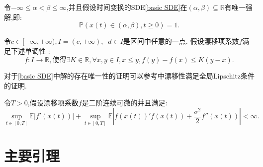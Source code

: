 \begin{assumption}\label{assum1}
	令$-\infty\leq\alpha<\beta\leq\infty$,并且假设时间变换的SDE\cref{basic SDE}在$(\alpha,\beta)\subseteq\mathbb{R}$有唯一强解,即:$$\mathbb{P}(x(t)\in(\alpha,\beta), t\geq0)=1.$$
\end{assumption}
\begin{assumption}\label{assum2}
	令$c\in[-\infty,+\infty),I=(c,+\infty),\operatorname{}d\in I$是区间中任意的一点. 假设漂移项系数$f$满足下述单调性 :
	\begin{equation}
		f:I\to\mathbb{R}  , 使得 \exists K \in\mathbb{R},\forall x,y\in I,x\leq y,f(y)-f(x)\leq K(y-x).
	\end{equation}
\end{assumption}
对于\cref{basic SDE}中解的存在唯一性的证明可以参考\cite{umarov2018beyond}中漂移性满足全局Lipschitz条件的证明.
\begin{assumption}\label{assum3}
	令$T>0$,假设漂移项系数$f$是二阶连续可微的并且满足:
	\begin{equation}
		\sup\limits_{t\in[0,T]}\mathbb{E}\left|f'(x(t))\right|+
		\sup\limits_{t\in[0,T]}\mathbb{E}\left|f(x(t))'f(x(t))+
		\frac{\sigma^2}2f''(x(t))\right|<\infty.
	\end{equation}
\end{assumption}

\section{主要引理}

